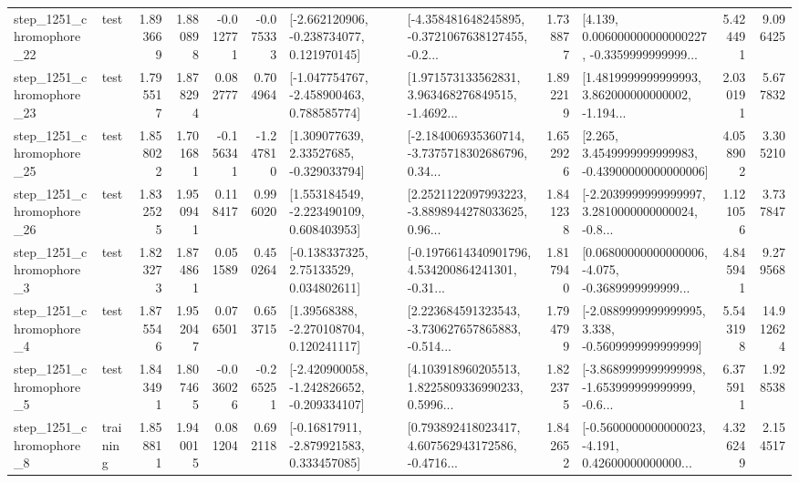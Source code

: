 \begin{tabular}{llrrrrllrlrr}
 step\_1251\_chromophore\_22 &      test &      1.893669 &    1.880898 &     -0.012771 & -0.075333 &   [-2.662120906, -0.238734077, 0.121970145] &  [-4.358481648245895, -0.3721067638127455, -0.2... &       1.738877 &  [4.139, 0.006000000000000227, -0.3359999999999... &            5.424491 &          9.096425 \\
 step\_1251\_chromophore\_23 &      test &      1.795517 &    1.878294 &      0.082777 &  0.704964 &   [-1.047754767, -2.458900463, 0.788585774] &  [1.971573133562831, 3.963468276849515, -1.4692... &       1.892219 &  [1.4819999999999993, 3.862000000000002, -1.194... &            2.030191 &          5.677832 \\
 step\_1251\_chromophore\_25 &      test &      1.858022 &    1.701681 &     -0.156341 & -1.247810 &     [1.309077639, 2.33527685, -0.329033794] &  [-2.184006935360714, -3.7375718302686796, 0.34... &       1.652926 &  [2.265, 3.4549999999999983, -0.43900000000000006] &            4.058902 &          3.305210 \\
 step\_1251\_chromophore\_26 &      test &      1.832525 &    1.950941 &      0.118417 &  0.996020 &    [1.553184549, -2.223490109, 0.608403953] &  [2.2521122097993223, -3.8898944278033625, 0.96... &       1.841238 &  [-2.2039999999999997, 3.2810000000000024, -0.8... &            1.121056 &          3.737847 \\
  step\_1251\_chromophore\_3 &      test &      1.823273 &    1.874861 &      0.051589 &  0.450264 &     [-0.138337325, 2.75133529, 0.034802611] &  [-0.1976614340901796, 4.534200864241301, -0.31... &       1.817940 &  [0.06800000000000006, -4.075, -0.3689999999999... &            4.845941 &          9.279568 \\
  step\_1251\_chromophore\_4 &      test &      1.875546 &    1.952047 &      0.076501 &  0.653715 &     [1.39568388, -2.270108704, 0.120241117] &  [2.223684591323543, -3.730627657865883, -0.514... &       1.794799 &  [-2.0889999999999995, 3.338, -0.5609999999999999] &            5.543198 &         14.912624 \\
  step\_1251\_chromophore\_5 &      test &      1.843491 &    1.807465 &     -0.036026 & -0.265251 &  [-2.420900058, -1.242826652, -0.209334107] &  [4.103918960205513, 1.8225809336990233, 0.5996... &       1.822375 &  [-3.8689999999999998, -1.653999999999999, -0.6... &            6.375911 &          1.928538 \\
  step\_1251\_chromophore\_8 &  training &      1.858811 &    1.940015 &      0.081204 &  0.692118 &    [-0.16817911, -2.879921583, 0.333457085] &  [0.793892418023417, 4.607562943172586, -0.4716... &       1.842652 &  [-0.5600000000000023, -4.191, 0.42600000000000... &            4.326249 &          2.154517 \\

\end{tabular}
